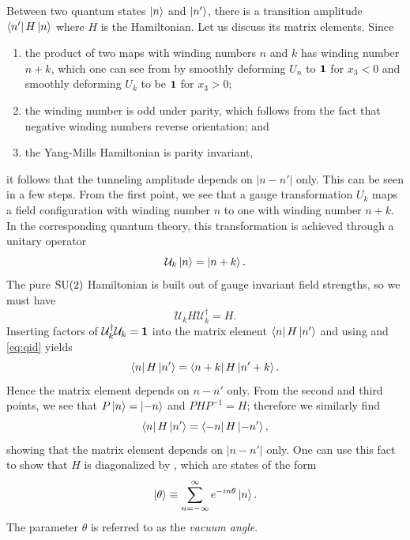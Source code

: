 Between two quantum states $\ket{n}$ and $\ket{n'}$, there is a 
transition amplitude $\bra{n'}H\ket{n}$ where $H$ is the Hamiltonian. 
Let us discuss its matrix elements. Since 
\begin{enumerate}
  \item the product of two maps with winding numbers $n$ and $k$ 
        has winding number $n+k$, which one can see from 
        by smoothly deforming $U_n$ to ${\mathbf 1}$ for $x_3<0$ and
        smoothly deforming $U_k$ to be ${\mathbf 1}$ for $x_3>0$;
  \item the winding number is odd under parity, which follows from the
        fact that negative winding numbers reverse orientation; and
  \item the Yang-Mills Hamiltonian is parity invariant,
\end{enumerate}
it follows that the tunneling amplitude depends on $|n-n'|$ only.
This can be seen in a few steps. From the first point, we see that
a gauge transformation $U_k$ maps a field configuration with
winding number $n$ to one with winding number $n+k$. In the
corresponding quantum theory, this transformation is achieved 
through a unitary operator
\begin{equation}\label{eq:qwn}
  \mathcal{U}_k\ket{n}=\ket{n+k}.
\end{equation}
The pure $\operatorname{SU}(2)$ Hamiltonian is built out of gauge invariant
field strengths, so we must have 
\begin{equation}\label{eq:qid}
  \mathcal{U}_kH\mathcal{U}_k^\dagger=H.
\end{equation}
Inserting factors of $\mathcal{U}_k^\dagger\mathcal{U}_k={\mathbf 1}$ into
the matrix element $\bra{n}H\ket{n'}$ and using 
and \eqref{eq:qid} yields
\begin{equation}
  \bra{n}H\ket{n'}=\bra{n+k}H\ket{n'+k}.
\end{equation}
Hence the matrix element depends on $n-n'$ only. From the second and
third points, we see that $P\ket{n}=\ket{-n}$ and $PHP^{-1}=H$;
therefore we similarly find
\begin{equation}
  \bra{n}H\ket{n'}=\bra{-n}H\ket{-n'},
\end{equation}
showing that the matrix element depends on $|n-n'|$ only.
One can use this fact to show that $H$ is diagonalized by 
, which are states of the form
\begin{equation}
  \ket{\theta}\equiv\sum\limits_{n=-\infty}^\infty e^{-i n\theta}\ket{n}.
\end{equation}
The parameter $\theta$ is referred to as the {\it vacuum angle}. 

